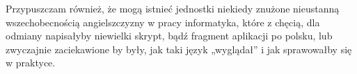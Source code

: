 Przypuszczam również, że mogą istnieć jednostki niekiedy znużone nieustanną wszechobecnością angielszczyzny w pracy informatyka, które z chęcią, dla odmiany napisałyby niewielki skrypt, bądź fragment aplikacji po polsku, lub zwyczajnie zaciekawione by były, jak taki język „wyglądał” i jak sprawowałby się w praktyce.


